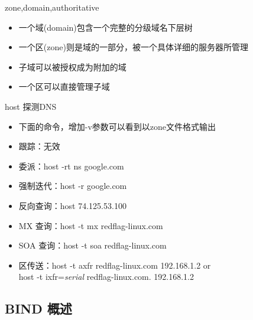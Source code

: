 \begin{frame}{zone,domain,authoritative}
\begin{itemize}
\item 一个域(domain)包含一个完整的分级域名下层树
\item 一个区(zone)则是域的一部分，被一个具体详细的服务器所管理
\item 子域可以被授权成为附加的域
\item 一个区可以直接管理子域
\end{itemize}

\end{frame} 
\begin{frame}{host 探测DNS}
\begin{itemize}
\item 下面的命令，增加-v参数可以看到以zone文件格式输出
\item 跟踪：无效
\item 委派：host -rt ns google.com
\item 强制迭代：host -r google.com
\item 反向查询：host 74.125.53.100
\item MX 查询：host -t mx redflag-linux.com
\item SOA 查询：host -t soa redflag-linux.com
\item 区传送：host -t axfr redflag-linux.com 192.168.1.2 or\\
host -t ixfr=\emph{serial} redflag-linux.com. 192.168.1.2
\end{itemize}

\end{frame} 
\subsection{BIND 概述}


